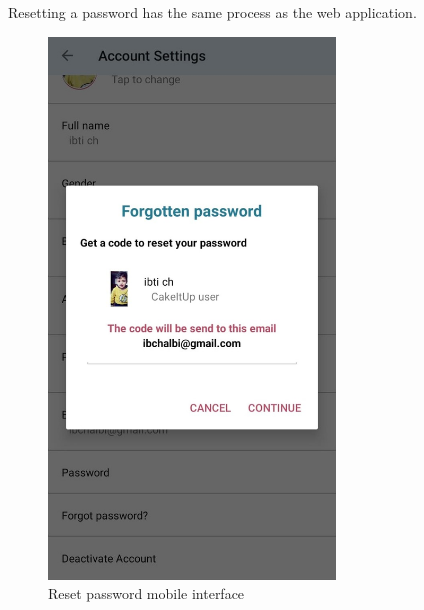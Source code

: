 \documentclass[12pt,a4paper]{report}
\begin{document}
\clearpage
Resetting a password has the same process as the web application.
\begin{figure}[H]
			\vspace*{1in}
	\centering
	\includegraphics[width=3in,keepaspectratio]{resetpasswordmobile.jpg}
	\caption{Reset password mobile interface}
	\label{resetpasswordmobile-interface}
\end{figure}
\clearpage
\end{document}
